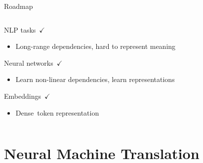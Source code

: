 \documentclass[12pt]{beamer}
\begin{document}
\begin{frame}{Roadmap}
	
	\begin{columns}
		
		\begin{column}{0.5\linewidth}
			
			
			NLP tasks $\checkmark$
			
			\begin{itemize}
				\item {\scriptsize Long-range dependencies, hard to represent meaning}
			\end{itemize}
			
			Neural networks $\checkmark$
			
			\begin{itemize}
				\item {\scriptsize Learn non-linear dependencies, learn representations}
			\end{itemize}
			
			Embeddings $\checkmark$
			
			\begin{itemize}
				\item {\scriptsize Dense token representation}
			\end{itemize}
			
			
		\end{column}
		
		\begin{column}{0.5\linewidth}
			
			
		\end{column}
		
	\end{columns}
	
\end{frame}

\section{Neural Machine Translation}
\end{document}
